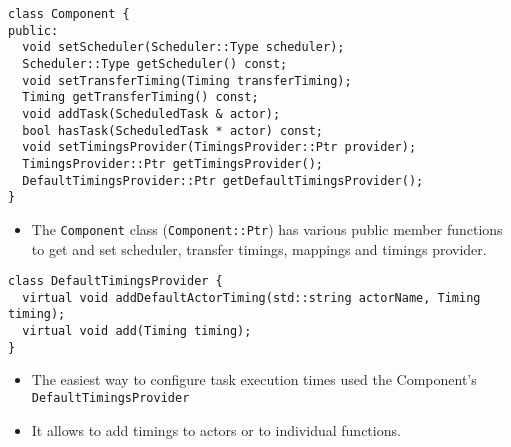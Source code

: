 \begin{frame}[fragile=singleslide]
\begin{lstlisting}
class Component {
public:
  void setScheduler(Scheduler::Type scheduler);
  Scheduler::Type getScheduler() const;
  void setTransferTiming(Timing transferTiming);
  Timing getTransferTiming() const;
  void addTask(ScheduledTask & actor);
  bool hasTask(ScheduledTask * actor) const;
  void setTimingsProvider(TimingsProvider::Ptr provider);
  TimingsProvider::Ptr getTimingsProvider();
  DefaultTimingsProvider::Ptr getDefaultTimingsProvider();
}
\end{lstlisting}
\begin{itemize}
\item The \lstinline!Component! class (\lstinline!Component::Ptr!) has various public member functions to get and set scheduler, transfer timings, mappings and timings provider.
\end{itemize}
\end{frame}



\begin{frame}[fragile=singleslide]
\begin{lstlisting}
class DefaultTimingsProvider {
  virtual void addDefaultActorTiming(std::string actorName, Timing timing);
  virtual void add(Timing timing);
}

\end{lstlisting}
\begin{itemize}
\item The easiest way to configure task execution times used the Component's \lstinline!DefaultTimingsProvider!
\item It allows to add timings to actors or to individual functions.
\end{itemize}
\end{frame}


